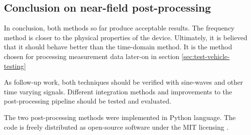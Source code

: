 \subsection{Conclusion on near-field post-processing}

In conclusion, both methods so far produce acceptable results.
The frequency method is closer to the physical properties of the device.
Ultimately, it is believed that it should behave better than the time-domain method.
It is the method chosen for processing measurement data later-on in section \ref{sec:test-vehicle-testing}

As follow-up work, both techniques should be verified with sine-waves and other time varying signals.
Different integration methods and improvements to the post-processing pipeline should be tested and evaluated.

The two post-processing methods were implemented in Python language.
The code is freely distributed \cite{nfs-repository} as open-source software under the MIT licensing \cite{mit-licensing}.
